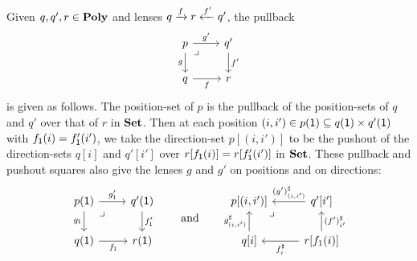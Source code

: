 \documentclass[Book-Poly]{subfiles}
\begin{document}
\begin{example}\label{ex.pullbacks_in_poly}
Given $q,q',r \in \mathbf{Poly}$ and lenses $q\xrightarrow{f} r\xleftarrow{f'} q'$, the pullback 
\[
\begin{tikzcd}
	p\ar[r, "g'"]\ar[d, "g"']&
	q'\ar[d, "f'"]\\
	q\ar[r, "f"']&
	r\ar[ul, phantom, very near end, "\lrcorner"]
\end{tikzcd}
\]
is given as follows.
The position-set of $p$ is the pullback of the position-sets of $q$ and $q'$ over that of $r$ in $\mathbf{Set}$.
Then at each position $(i, i') \in p(\textsf{1}) \subseteq q(\textsf{1}) \times q'(\textsf{1})$ with $f_{\textsf{1}}(i)=f'_{\textsf{1}}(i')$, we take the direction-set $p[(i, i')]$ to be the pushout of the direction-sets $q[i]$ and $q'[i']$ over $r[f_{\textsf{1}}(i)]=r[f_{\textsf{1}}'(i')]$ in $\mathbf{Set}$.
These pullback and pushout squares also give the lenses $g$ and $g'$ on positions and on directions:
\begin{equation}\label{eqn.pullback_poly}
\begin{tikzcd}
	p(\1)\ar[r, "g'_\1"]\ar[d, "g_\1"']&
	q'(\1)\ar[d, "f_\1'"]\\
	q(\1)\ar[r, "f_\1"']&
	r(\1)\ar[ul, phantom, very near end, "\lrcorner"]
\end{tikzcd}
\qqand
\begin{tikzcd}
	p[(i,i')]\ar[from=r, "(g')^\sharp_{(i,i')}"']\ar[from=d, "g^\sharp_{(i,i')}"]&
	q'[i']\ar[from=d, "(f')^\sharp_{i'}"']\\
	q[i]\ar[from=r, "f^\sharp_i"]&
	r[f_1(i)]\ar[ul, phantom, very near end, "\lrcorner"]
\end{tikzcd}
\end{equation}
\end{example}
\end{document}
